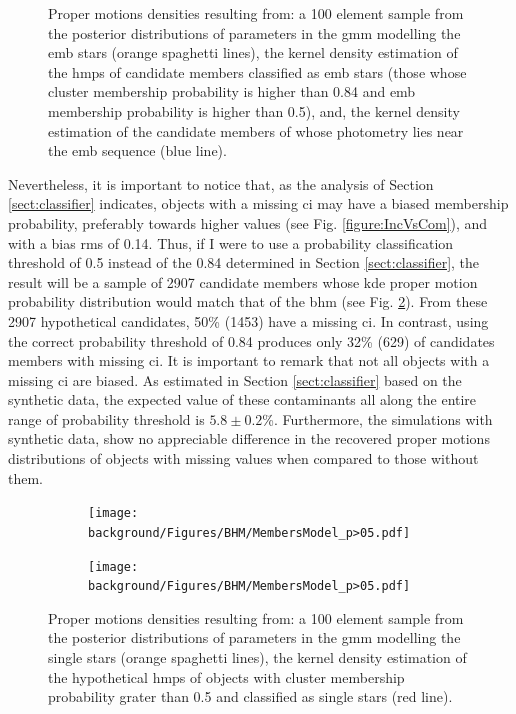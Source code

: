 \begin{figure}[ht!]
\begin{subfigure}[t]{0.45\textwidth}
        \caption{}
    \end{subfigure}
\caption{Proper motions densities resulting from: a 100 element sample from the posterior distributions of parameters in the \gls{gmm} modelling the \gls{emb} stars (orange spaghetti lines), the kernel density estimation of the \gls{hmps} of candidate members classified as \gls{emb} stars (those whose cluster membership probability is higher than 0.84 and \gls{emb} membership probability is higher than 0.5), and, the kernel density estimation of the candidate members of \citet{Bouy2015} whose photometry lies near the \gls{emb} sequence (blue line).}
\label{fig:PMBs}
\end{figure}

Nevertheless, it is important to notice that, as the analysis of Section \ref{sect:classifier} indicates, objects with a missing \gls{ci} may have a biased membership probability, preferably towards higher values (see Fig. \ref{figure:IncVsCom}), and with a bias rms of 0.14. Thus, if I were to use a probability classification threshold of 0.5 instead of the 0.84 determined in Section \ref{sect:classifier}, the result will be a sample of  2907 candidate members whose \gls{kde} proper motion probability distribution would match that of the \gls{bhm} (see Fig. \ref{fig:PMCs>0.5}). From these 2907 hypothetical candidates, 50\% (1453) have a missing \gls{ci}. In contrast, using the correct probability threshold of 0.84 produces only 32\% (629) of candidates members with missing \gls{ci}. It is important to remark that not all objects with a missing \gls{ci} are biased. As estimated in Section \ref{sect:classifier} based on the synthetic data, the expected value of these contaminants all along the entire range of probability threshold is $5.8\pm 0.2$\%. Furthermore, the simulations with synthetic data, show no appreciable difference in the recovered proper motions distributions of objects with missing values when compared to those without them.

\begin{figure}[ht!]
    \centering
    \begin{subfigure}[t]{0.45\textwidth}
    \centering
       \texttt{[image: background/Figures/BHM/MembersModel\_p>05.pdf]}
        \caption{}
    \end{subfigure}
    \begin{subfigure}[t]{0.45\textwidth}
    \centering
     \texttt{[image: background/Figures/BHM/MembersModel\_p>05.pdf]}
        \caption{}
    \end{subfigure}
\caption{Proper motions densities resulting from: a 100 element sample from the posterior distributions of parameters in the \gls{gmm} modelling the single stars (orange spaghetti lines), the kernel density estimation of the hypothetical \gls{hmps} of objects with cluster membership probability grater than 0.5 and classified as single stars (red line).}
\label{fig:PMCs>0.5}
\end{figure}

